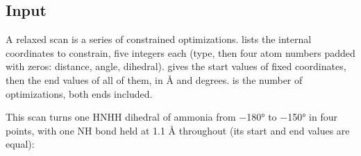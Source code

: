 \documentclass[letterpaper,10pt,english,openany,oneside]{sphinxmanual}
\begin{document}
\subsection{Input}
\label{\detokenize{tasks/ts-irc-scan:input}}
\sphinxAtStartPar
A relaxed scan is a series of constrained optimizations. {\hyperref[\detokenize{reference/optimize:optimize-fix}]{}} lists the internal coordinates to
constrain, five integers each (type, then four atom numbers padded with zeros:  distance,  angle, 
dihedral). {\hyperref[\detokenize{reference/optimize:optimize-value}]{}} gives the start values of  fixed coordinates, then the end values of
all of them, in Å and degrees. {\hyperref[\detokenize{reference/optimize:optimize-points}]{}} is the number of optimizations, both ends included.



\sphinxAtStartPar
This scan turns one H\textendash{}N\textendash{}H\textendash{}H dihedral of ammonia from −180° to −150° in four points, with one N\textendash{}H bond held at
1.1 Å throughout (its start and end values are equal):
\end{document}
